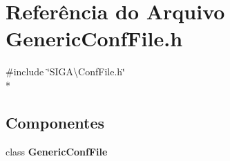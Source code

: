 \section{Referência do Arquivo Generic\+Conf\+File.\+h}
\label{_generic_conf_file_8h}
{\ttfamily \#include \char`\"{}S\+I\+G\+A\textbackslash{}\+Conf\+File.\+h\char`\"{}}\\*
\subsection*{Componentes}
\begin{DoxyCompactItemize}
\item 
class {\bf Generic\+Conf\+File}
\end{DoxyCompactItemize}
